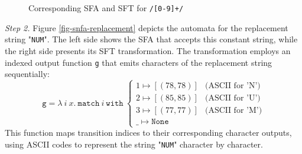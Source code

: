 \documentclass[sigplan,10pt,anonymous,review]{acmart}\settopmatter{printfolios=true,printccs=false,printacmref=false}
\begin{document}
\begin{figure}[h] \centering
{}
\caption{Corresponding SFA and SFT for \texttt{/[0-9]+/}}
\label{fig-snfa-pattern}
\end{figure}

\noindent\emph{Step 2.}
Figure \ref{fig-snfa-replacement} depicts the automata for the replacement string "\texttt{NUM}". The left side shows the SFA that accepts this constant string, while the right side presents its SFT transformation. The transformation employs an indexed output function \texttt{g} that emits characters of the replacement string sequentially:
\[
\texttt{g} = \lambda~i~x.~\texttt{match}~i~\texttt{with}~
\begin{cases}
1 \mapsto [(78, 78)] & \text{(ASCII for 'N')} \\
2 \mapsto [(85, 85)] & \text{(ASCII for 'U')} \\
3 \mapsto [(77, 77)] & \text{(ASCII for 'M')} \\
\_ \mapsto \texttt{None}
\end{cases}
\]
This function maps transition indices to their corresponding character outputs, using ASCII codes to represent the string "\texttt{NUM}" character by character.
\end{document}
